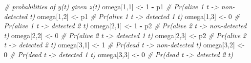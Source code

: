 \documentclass[
  12pt,
]{krantz}
\newenvironment{Shaded}{\begin{snugshade}}{\end{snugshade}}
\newcommand{\CommentTok}[1]{\textcolor[rgb]{0.56,0.35,0.01}{\textit{#1}}}
\newcommand{\DecValTok}[1]{\textcolor[rgb]{0.00,0.00,0.81}{#1}}
\newcommand{\NormalTok}[1]{#1}
\newcommand{\OtherTok}[1]{\textcolor[rgb]{0.56,0.35,0.01}{#1}}
\newcommand{\SpecialCharTok}[1]{\textcolor[rgb]{0.81,0.36,0.00}{\textbf{#1}}}
\begin{document}
\begin{Shaded}
\begin{Highlighting}[]
  \CommentTok{\# probabilities of y(t) given z(t)}
\NormalTok{  omega[}\DecValTok{1}\NormalTok{,}\DecValTok{1}\NormalTok{] }\OtherTok{\textless{}{-}} \DecValTok{1} \SpecialCharTok{{-}}\NormalTok{ p1     }\CommentTok{\# Pr(alive 1 t {-}\textgreater{} non{-}detected t)}
\NormalTok{  omega[}\DecValTok{1}\NormalTok{,}\DecValTok{2}\NormalTok{] }\OtherTok{\textless{}{-}}\NormalTok{ p1         }\CommentTok{\# Pr(alive 1 t {-}\textgreater{} detected 1 t)}
\NormalTok{  omega[}\DecValTok{1}\NormalTok{,}\DecValTok{3}\NormalTok{] }\OtherTok{\textless{}{-}} \DecValTok{0}          \CommentTok{\# Pr(alive 1 t {-}\textgreater{} detected 2 t)}
\NormalTok{  omega[}\DecValTok{2}\NormalTok{,}\DecValTok{1}\NormalTok{] }\OtherTok{\textless{}{-}} \DecValTok{1} \SpecialCharTok{{-}}\NormalTok{ p2     }\CommentTok{\# Pr(alive 2 t {-}\textgreater{} non{-}detected t)}
\NormalTok{  omega[}\DecValTok{2}\NormalTok{,}\DecValTok{2}\NormalTok{] }\OtherTok{\textless{}{-}} \DecValTok{0}          \CommentTok{\# Pr(alive 2 t {-}\textgreater{} detected 1 t)}
\NormalTok{  omega[}\DecValTok{2}\NormalTok{,}\DecValTok{3}\NormalTok{] }\OtherTok{\textless{}{-}}\NormalTok{ p2         }\CommentTok{\# Pr(alive 2 t {-}\textgreater{} detected 2 t)}
\NormalTok{  omega[}\DecValTok{3}\NormalTok{,}\DecValTok{1}\NormalTok{] }\OtherTok{\textless{}{-}} \DecValTok{1}          \CommentTok{\# Pr(dead t {-}\textgreater{} non{-}detected t)}
\NormalTok{  omega[}\DecValTok{3}\NormalTok{,}\DecValTok{2}\NormalTok{] }\OtherTok{\textless{}{-}} \DecValTok{0}          \CommentTok{\# Pr(dead t {-}\textgreater{} detected 1 t)}
\NormalTok{  omega[}\DecValTok{3}\NormalTok{,}\DecValTok{3}\NormalTok{] }\OtherTok{\textless{}{-}} \DecValTok{0}          \CommentTok{\# Pr(dead t {-}\textgreater{} detected 2 t)}
  

\end{Highlighting}
\end{Shaded}
\end{document}
